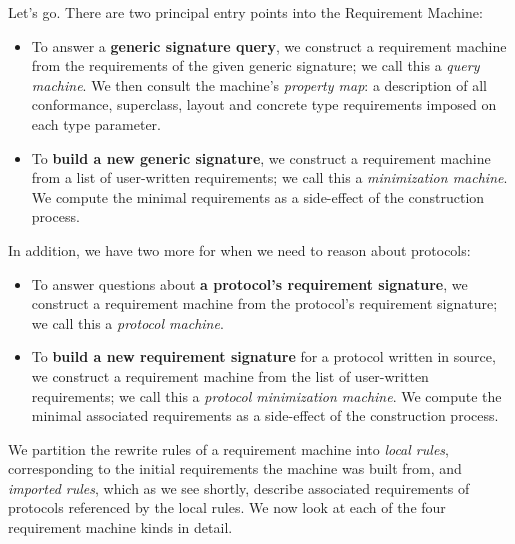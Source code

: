 \documentclass[../generics]{subfiles}
\begin{document}
Let's go. There are two principal entry points into the Requirement Machine:
\begin{itemize}
\item To answer a \textbf{generic signature query}, we construct a requirement machine from the requirements of the given generic signature; we call this a \emph{query machine}. We then consult the machine's \emph{property map}: a description of all conformance, superclass, layout and concrete type requirements imposed on each type parameter.

\item To \textbf{build a new generic signature}, we construct a requirement machine from a list of user-written requirements; we call this a \emph{minimization machine}. We compute the minimal requirements as a side-effect of the construction process.
\end{itemize}
In addition, we have two more for when we need to reason about protocols:
\begin{itemize}
\item To answer questions about \textbf{a protocol's requirement signature}, we construct a requirement machine from the protocol's requirement signature; we call this a \emph{protocol machine}.
\item To \textbf{build a new requirement signature} for a protocol written in source, we construct a requirement machine from the list of user-written requirements; we call this a \emph{protocol minimization machine}. We compute the minimal associated requirements as a side-effect of the construction process.
\end{itemize}

We partition the rewrite rules of a requirement machine into \emph{local rules}, corresponding to the initial requirements the machine was built from, and \emph{imported rules}, which as we see shortly, describe associated requirements of protocols referenced by the local rules. We now look at each of the four requirement machine kinds in detail.
\end{document}
